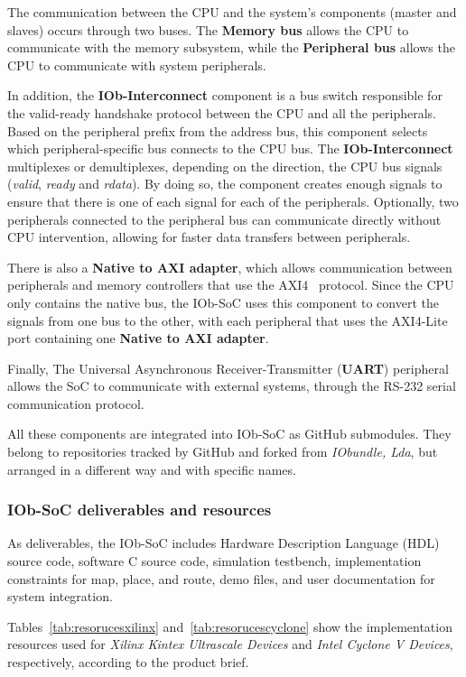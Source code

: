 The communication between the CPU and the system’s components (master and slaves) occurs through two buses. The \textbf{Memory bus} allows the CPU to communicate with the memory subsystem, while the \textbf{Peripheral bus} allows the CPU to communicate with system peripherals.

In addition, the \textbf{IOb-Interconnect} component is a bus switch responsible for the valid-ready handshake protocol between the CPU and all the peripherals. Based on the peripheral prefix from the address bus, this component selects which peripheral-specific bus connects to the CPU bus.  
The \textbf{IOb-Interconnect} multiplexes or demultiplexes, depending on the direction, the CPU bus signals (\textit{valid}, \textit{ready} and \textit{rdata}). By doing so, the component creates enough signals to ensure that there is one of each signal for each of the peripherals. Optionally, two peripherals connected to the peripheral bus can communicate directly without CPU intervention, allowing for faster data transfers between peripherals.

There is also a \textbf{Native to AXI adapter}, which allows communication between peripherals and memory controllers that use the AXI4~\cite{bib:axi_amba} protocol. Since the CPU only contains the native bus, the IOb-SoC uses this component to convert the signals from one bus to the other, with each peripheral that uses the AXI4-Lite port containing one \textbf{Native to AXI adapter}.

Finally, The Universal Asynchronous Receiver-Transmitter (\textbf{\textbf{UART}}) peripheral allows the SoC to communicate with external systems, through the RS-232 serial communication protocol.

All these components are integrated into IOb-SoC as GitHub submodules. They belong to repositories tracked by GitHub and forked from \textit{IObundle, Lda}, but arranged in a different way and with specific names.

\subsubsection{IOb-SoC deliverables and resources}
As deliverables, the IOb-SoC includes Hardware Description Language (HDL) source code, software C source code, simulation testbench, implementation constraints for map, place, and route, demo files, and user documentation for system integration.

Tables~\ref{tab:resorucesxilinx} and~\ref{tab:resorucescyclone} show the implementation resources used for \textit{Xilinx Kintex Ultrascale Devices} and \textit{Intel Cyclone V Devices}, respectively, according to the product brief.

